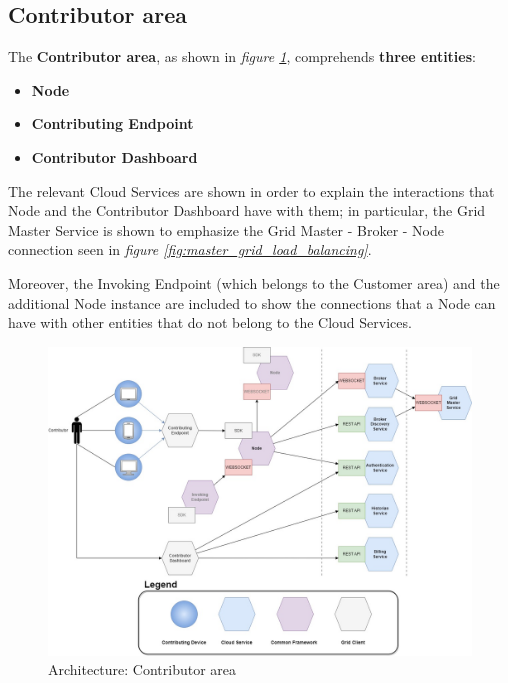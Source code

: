 \subsection{Contributor area}\label{contributor_area}
The \textbf{Contributor area}, as shown in \textit{figure \ref{fig:architecture_contributor}}, comprehends \textbf{three entities}:
\begin{itemize}
    \item \textbf{Node}
    \item \textbf{Contributing Endpoint}
    \item \textbf{Contributor Dashboard}
\end{itemize}
The relevant Cloud Services are shown in order to explain the interactions that Node and the Contributor Dashboard have with them; in particular, the Grid Master Service is shown to emphasize the Grid Master - Broker - Node connection seen in \textit{figure \ref{fig:master_grid_load_balancing}}.

Moreover, the Invoking Endpoint (which belongs to the Customer area) and the additional Node instance are included to show the connections that a Node can have with other entities that do not belong to the Cloud Services.

\vspace{5mm}

\begin{figure}[!ht]
    \centering
    \includegraphics[width=\linewidth]{document/chapters/chapter_6/images/architecture_contributor.jpg}
    \caption{Architecture: Contributor area}
    \label{fig:architecture_contributor}
\end{figure}

